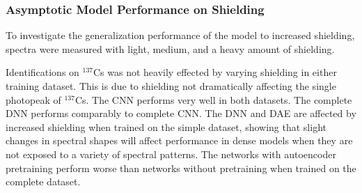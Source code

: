 \subsubsection{Asymptotic Model Performance on Shielding}

To investigate the generalization performance of the model to increased shielding, spectra were measured with light, medium, and a heavy amount of shielding. 

Identifications on $^{137}$Cs was not heavily effected by varying shielding in either training dataset. This is due to shielding not dramatically affecting the single photopeak of $^{137}$Cs. The CNN performs very well in both datasets. The complete DNN performs comparably to complete CNN. The DNN and DAE are affected by increased shielding when trained on the simple dataset, showing that slight changes in spectral shapes will affect performance in dense models when they are not exposed to a variety of spectral patterns. The networks with autoencoder pretraining perform worse than networks without pretraining when trained on the complete dataset.



